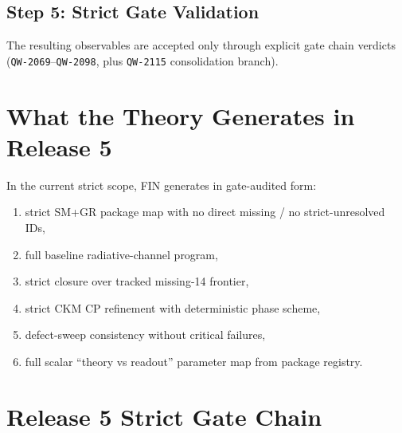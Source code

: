 \documentclass[11pt,a4paper]{article}
\newcommand{\QW}[1]{\texttt{QW-#1}}
\begin{document}
\subsection{Step 5: Strict Gate Validation}
The resulting observables are accepted only through explicit gate chain verdicts (\QW{2069}--\QW{2098}, plus \QW{2115} consolidation branch).

\section{What the Theory Generates in Release 5}
In the current strict scope, FIN generates in gate-audited form:
\begin{enumerate}[leftmargin=1.5em]
    \item strict SM+GR package map with no direct missing / no strict-unresolved IDs,
    \item full baseline radiative-channel program,
    \item strict closure over tracked missing-14 frontier,
    \item strict CKM CP refinement with deterministic phase scheme,
    \item defect-sweep consistency without critical failures,
    \item full scalar ``theory vs readout'' parameter map from package registry.
\end{enumerate}

\section{Release 5 Strict Gate Chain}
\end{document}
